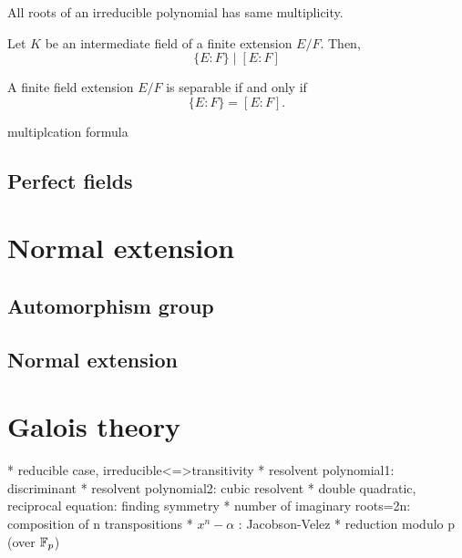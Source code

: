 \documentclass{../exp}
\begin{document}
\begin{lem}
All roots of an irreducible polynomial has same multiplicity.
\end{lem}
\begin{pf}
\end{pf}

\begin{thm}
Let $K$ be an intermediate field of a finite extension $E/F$.
Then,
\[\{E:F\}\mid[E:F]\]
\end{thm}
\begin{pf}
\end{pf}

\begin{thm}
A finite field extension $E/F$ is separable if and only if
\[\{E:F\}=[E:F].\]
\end{thm}
\begin{pf}
\end{pf}


multiplcation formula





\subsection{Perfect fields}









\section{Normal extension}
\subsection{Automorphism group}

\subsection{Normal extension}









\section{Galois theory}

 * reducible case, irreducible<=>transitivity
 * resolvent polynomial1: discriminant
 * resolvent polynomial2: cubic resolvent
 * double quadratic, reciprocal equation: finding symmetry
 * number of imaginary roots=2n: composition of n transpositions
 * $x^n-\alpha$ :  Jacobson-Velez
 * reduction modulo p (over $\mathbb{F}_p$)
\end{document}
